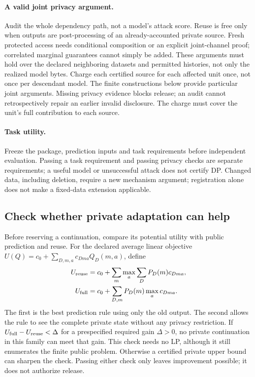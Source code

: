 \paragraph{A valid joint privacy argument.}
Audit the whole dependency path, not a model's attack score. Reuse is
free only when outputs are post-processing of an already-accounted
private source. Fresh protected access needs conditional composition
or an explicit joint-channel proof; correlated marginal guarantees
cannot simply be added. These arguments must hold over the declared
neighboring datasets and permitted histories, not only the realized
model bytes. Charge each certified source for each affected
unit once, not once per descendant model. The finite constructions
below provide particular joint arguments. Missing privacy evidence
blocks release; an audit cannot retrospectively repair an earlier
invalid disclosure.
The charge must cover the unit's full contribution to each source.

\paragraph{Task utility.}
Freeze the package, prediction inputs and task requirements before
independent evaluation. Passing a task requirement and passing privacy
checks are separate requirements; a useful model or unsuccessful attack
does not certify DP. Changed data, including deletion, require a new
mechanism argument; registration alone does not make a fixed-data
extension applicable.



\subsection{Check whether private adaptation can help}
\label{sec:information-value}
Before reserving a continuation, compare its potential utility with
public prediction and reuse. For the declared average linear objective
$U(Q)=c_0+\sum_{D,m,a}c_{Dma}Q_D(m,a)$, define
\begin{align}
 U_{\rm reuse}&=c_0+\sum_m\max_a\sum_D P_D(m)c_{Dma},\nonumber\\
 U_{\rm full}&=c_0+\sum_{D,m}P_D(m)\max_a c_{Dma}.
 \label{eq:information-value}
\end{align}
The first is the best prediction rule using only the old output.
The second allows the rule to see the complete private state without
any privacy restriction. If $U_{\rm full}-U_{\rm reuse}<\Delta$ for a
prespecified required gain $\Delta>0$, no private continuation in this
family can meet that gain. This check needs no LP, although it still
enumerates the finite public problem. Otherwise a certified private
upper bound can sharpen the check. Passing either check only leaves
improvement possible; it does not authorize release.

